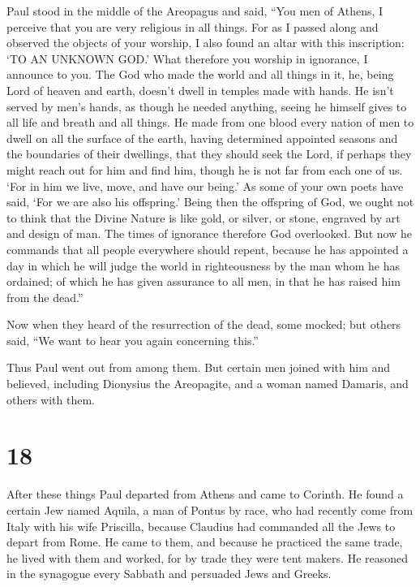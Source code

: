  Paul stood in the middle of the Areopagus and said,
``You men of Athens, I perceive that you are very religious in all
things.  For as I passed along and observed the objects
of your worship, I also found an altar with this inscription: `TO AN
UNKNOWN GOD.' What therefore you worship in ignorance, I announce to
you.  The God who made the world and all things in it,
he, being Lord of heaven and earth, doesn't dwell in temples made with
hands.  He isn't served by men's hands, as though he
needed anything, seeing he himself gives to all life and breath and all
things.  He made from one blood every nation of men to
dwell on all the surface of the earth, having determined appointed
seasons and the boundaries of their dwellings,  that they
should seek the Lord, if perhaps they might reach out for him and find
him, though he is not far from each one of us.  `For in
him we live, move, and have our being.' As some of your own poets have
said, `For we are also his offspring.'  Being then the
offspring of God, we ought not to think that the Divine Nature is like
gold, or silver, or stone, engraved by art and design of man.
 The times of ignorance therefore God overlooked. But now
he commands that all people everywhere should repent, 
because he has appointed a day in which he will judge the world in
righteousness by the man whom he has ordained; of which he has given
assurance to all men, in that he has raised him from the dead.''

 Now when they heard of the resurrection of the dead,
some mocked; but others said, ``We want to hear you again concerning
this.''

 Thus Paul went out from among them.  But
certain men joined with him and believed, including Dionysius the
Areopagite, and a woman named Damaris, and others with them.

\hypertarget{section-17}{%
\section{18}\label{section-17}}

 After these things Paul departed from Athens and came to
Corinth.  He found a certain Jew named Aquila, a man of
Pontus by race, who had recently come from Italy with his wife
Priscilla, because Claudius had commanded all the Jews to depart from
Rome. He came to them,  and because he practiced the same
trade, he lived with them and worked, for by trade they were tent
makers.  He reasoned in the synagogue every Sabbath and
persuaded Jews and Greeks.

